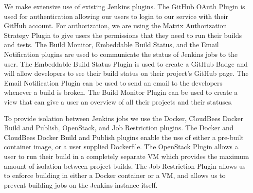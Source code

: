 \documentclass[10pt,onecolumn,journal,draftclsnofoot]{IEEEtran}
\begin{document}
We make extensive use of existing Jenkins plugins.
The GitHub OAuth Plugin is used for authentication allowing our users to login to our service with their GitHub account.
For authorization, we are using the Matrix Authorization Strategy Plugin to give users the permissions that they need to run their builds and tests.
The Build Monitor, Embeddable Build Status, and the Email Notification plugins are used to communicate the status of Jenkins jobs to the user.
The Embeddable Build Status Plugin is used to create a GitHub Badge and will allow developers to see their build status on their project's GitHub page.
The Email Notification Plugin can be used to send an email to the developers whenever a build is broken.
The Build Monitor Plugin can be used to create a view that can give a user an overview of all their projects and their statuses.

To provide isolation between Jenkins jobs we use the Docker, CloudBees Docker Build and Publish, OpenStack, and Job Restriction plugins. 
The Docker and CloudBees Docker Build and Publish plugins enable the use of either a pre-built container image, or a user supplied Dockerfile.
The OpenStack Plugin allows a user to run their build in a completely separate VM which provides the maximum amount of isolation between project builds. 
The Job Restriction Plugin allows us to enforce building in either a Docker container or a VM, and allows us to prevent building jobs on the Jenkins instance itself. 
\end{document}
